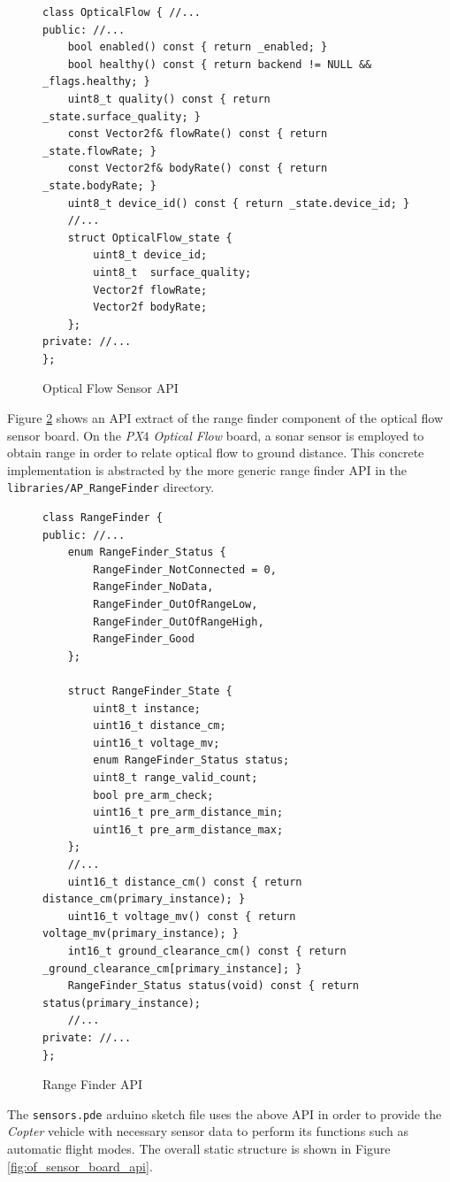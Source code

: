 \documentclass[paper=letter, fontsize=11pt]{scrartcl}
\numberwithin{equation}{section}
\numberwithin{figure}{section}
\numberwithin{table}{section}
\begin{document}
\begin{figure}[h]
	\begin{lstlisting}[basicstyle=\scriptsize]
class OpticalFlow { //...
public: //...
	bool enabled() const { return _enabled; }
	bool healthy() const { return backend != NULL && _flags.healthy; }
	uint8_t quality() const { return _state.surface_quality; }
	const Vector2f& flowRate() const { return _state.flowRate; }
	const Vector2f& bodyRate() const { return _state.bodyRate; }
	uint8_t device_id() const { return _state.device_id; }
    //...
    struct OpticalFlow_state {
    	uint8_t device_id;
    	uint8_t  surface_quality;
    	Vector2f flowRate;
    	Vector2f bodyRate;
    };
private: //...
};
	\end{lstlisting}
	\caption{Optical Flow Sensor \ac{API}}
	\label{fig:optical_flow_api}
\end{figure}

\par
Figure \ref{fig:range_finder_api} shows an \ac{API} extract of the range finder
component of the optical flow sensor board. On the {\em PX$4$ Optical Flow}
board, a sonar sensor is employed to obtain range in order to relate optical
flow to ground distance. This concrete implementation is abstracted by the
more generic range finder \ac{API} in the \texttt{libraries/AP\_RangeFinder}
directory.

\begin{figure}[h]
	\begin{lstlisting}[basicstyle=\scriptsize]
class RangeFinder {
public: //...
	enum RangeFinder_Status {
		RangeFinder_NotConnected = 0,
		RangeFinder_NoData,
		RangeFinder_OutOfRangeLow,
		RangeFinder_OutOfRangeHigh,
		RangeFinder_Good
	};
	
	struct RangeFinder_State {
		uint8_t instance;
		uint16_t distance_cm;
		uint16_t voltage_mv;
		enum RangeFinder_Status status;
		uint8_t range_valid_count;
		bool pre_arm_check;
		uint16_t pre_arm_distance_min;
		uint16_t pre_arm_distance_max;
	};
	//...
	uint16_t distance_cm() const { return distance_cm(primary_instance); }
	uint16_t voltage_mv() const { return voltage_mv(primary_instance); }
	int16_t ground_clearance_cm() const { return _ground_clearance_cm[primary_instance]; }
	RangeFinder_Status status(void) const { return status(primary_instance);
	//...
private: //...
};
	\end{lstlisting}
	\caption{Range Finder \ac{API}}
	\label{fig:range_finder_api}
\end{figure}

\par
The \texttt{sensors.pde} arduino sketch file uses the above \ac{API} in order
to provide the {\em Copter} vehicle with necessary sensor data to perform its
functions such as automatic flight modes. The overall static structure is shown
in Figure \ref{fig:of_sensor_board_api}.
\end{document}
